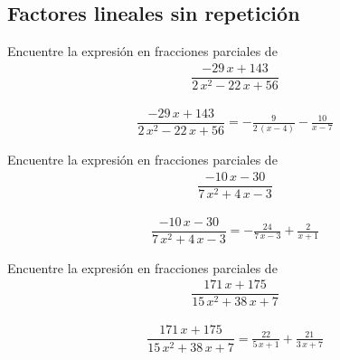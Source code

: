 \subsection{Factores lineales sin repetición}

{}
\begin{problema}
Encuentre la expresión en fracciones parciales de
\begin{align*}
	\dfrac{-29 \, x + 143}{2 \, x^{2} - 22 \, x + 56}
\end{align*}
\end{problema}

\begin{align*}
	\dfrac{-29 \, x + 143}{2 \, x^{2} - 22 \, x + 56}= -\frac{9}{2 \, {\left(x - 4\right)}} - \frac{10}{x - 7}
\end{align*}


{}
	\begin{problema}
		Encuentre la expresión en fracciones parciales de
		\begin{align*}
			\dfrac{-10 \, x - 30}{7 \, x^{2} + 4 \, x - 3}
		\end{align*}
	\end{problema}
	
	\begin{align*}
		\dfrac{-10 \, x - 30}{7 \, x^{2} + 4 \, x - 3}= -\frac{24}{7 \, x - 3} + \frac{2}{x + 1}
	\end{align*}
	

{}
	\begin{problema}
		Encuentre la expresión en fracciones parciales de
		\begin{align*}
			\dfrac{171 \, x + 175}{15 \, x^{2} + 38 \, x + 7}
		\end{align*}
	\end{problema}
	
	\begin{align*}
		\dfrac{171 \, x + 175}{15 \, x^{2} + 38 \, x + 7}= \frac{22}{5 \, x + 1} + \frac{21}{3 \, x + 7}
	\end{align*}
	

